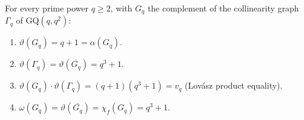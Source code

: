 \begin{theorem}\label{thm:theta-gq}
For every prime power $q\ge 2$, with $G_q$ the complement of the collinearity graph $\Gamma_q$ of $\mathrm{GQ}(q,q^2)$:
\begin{enumerate}
  \item[\textup{(a)}] $\vartheta(G_q) = q+1 = \alpha(G_q)$.
  \item[\textup{(b)}] $\vartheta(\Gamma_q) = \vartheta(\overline{G_q}) = q^3+1$.
  \item[\textup{(c)}] $\vartheta(G_q)\cdot\vartheta(\Gamma_q) = (q+1)(q^3+1) = v_q$ (Lov\'asz product equality).
  \item[\textup{(d)}] $\omega(G_q) = \vartheta(\overline{G_q}) = \chi_f(G_q) = q^3+1$.
\end{enumerate}
\end{theorem}

